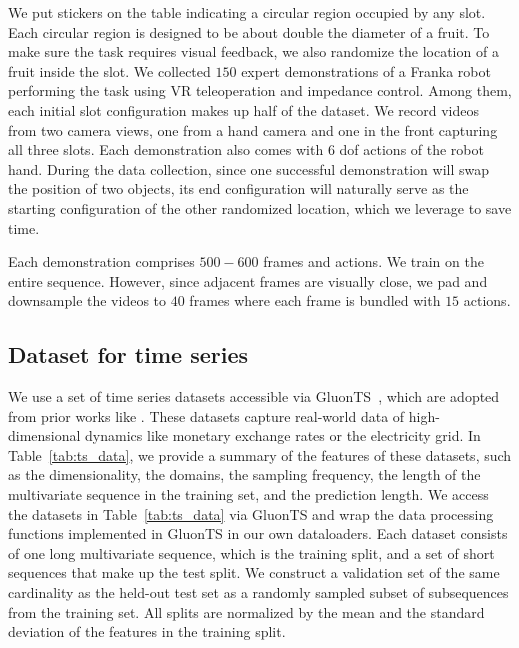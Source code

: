We put stickers on the table indicating a circular region occupied by any slot. Each circular region is designed to be about double the diameter of a fruit. To make sure the task requires visual feedback, we also randomize the location of a fruit inside the slot. We collected $150$ expert demonstrations of a Franka robot performing the task using VR teleoperation and impedance control. Among them, each initial slot configuration makes up half of the dataset. We record videos from two camera views, one from a hand camera and one in the front capturing all three slots. Each demonstration also comes with $6$ dof actions of the robot hand. During the data collection, since one successful demonstration will swap the position of two objects, its end configuration will naturally serve as the starting configuration of the other randomized location, which we leverage to save time. 

Each demonstration comprises $500-600$ frames and actions. We train \algo{} on the entire sequence. However, since adjacent frames are visually close, we pad and downsample the videos to $40$ frames where each frame is bundled with $15$ actions. 


\subsection{Dataset for time series }
\label{app:dataset_timeseries}

We use a set of time series datasets accessible via GluonTS~\cite{gluonts}, which are adopted from prior works like \cite{DBLP:journals/corr/YuRD15,DBLP:journals/corr/LaiCYL17,SALINAS20201181}. These datasets capture real-world data of high-dimensional dynamics like monetary exchange rates or the electricity grid. In Table~\ref{tab:ts_data}, we provide a summary of the features of these datasets, such as the dimensionality, the domains, the sampling frequency, the length of the multivariate sequence in the training set, and the prediction length. We access the datasets in Table~\ref{tab:ts_data} via GluonTS and wrap the data processing functions implemented in GluonTS in our own dataloaders. Each dataset consists of one long multivariate sequence, which is the training split, and a set of short sequences that make up the test split. We construct a validation set of the same cardinality as the held-out test set as a randomly sampled subset of subsequences from the training set. All splits are normalized by the mean and the standard deviation of the features in the training split.

